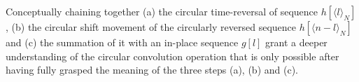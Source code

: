 \documentclass[\documentfontsize, twocolumn]{\classname}
\begin{document}
Conceptually chaining together (a) the circular time-reversal of sequence $h[\langle l\rangle_N]$, (b) the circular shift movement of the circularly reversed sequence $h[\langle n-l\rangle_N]$ and (c) the summation of it with an in-place sequence $g[l]$ grant a deeper understanding of the circular convolution operation that is only possible after having fully grasped the meaning of the three steps (a), (b) and (c).






\end{document}
